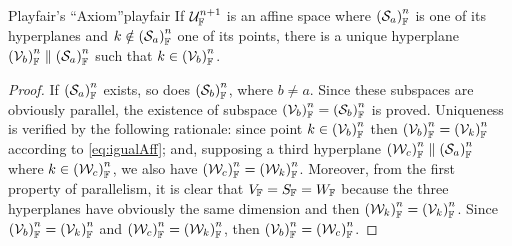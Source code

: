 \begin{mteo}{Playfair's ``Axiom''}{playfair}
If $\eamd{U}{F}{n+1}$ is an affine space where $\eamsd{S}{F}{a}{n}$ is one of its hyperplanes and $k\notin \eamsd{S}{F}{a}{n}$ one of its points, there is a unique hyperplane $\eamsd{V}{F}{b}{n}\parallel\eamsd{S}{F}{a}{n}$ such that $k\in\eamsd{V}{F}{b}{n}$.
\end{mteo}
\vspace{1pt}
{\footnotesize
\begin{proof}
If $\eamsd{S}{F}{a}{n}$ exists, so does $\eamsd{S}{F}{b}{n}$, where $b\neq a$. Since these subspaces are obviously parallel, the existence of subspace $\eamsd{V}{F}{b}{n}=\eamsd{S}{F}{b}{n}$ is proved. Uniqueness is verified by the following rationale: since point $k\in\eamsd{V}{F}{b}{n}$ then $\eamsd{V}{F}{b}{n}=\eamsd{V}{F}{k}{n}$ according to \eqref{eq:igualAff}; and, supposing a third hyperplane $\eamsd{W}{F}{c}{n}\parallel \eamsd{S}{F}{a}{n}$ where $k\in\eamsd{W}{F}{c}{n}$, we also have $\eamsd{W}{F}{c}{n}=\eamsd{W}{F}{k}{n}$. Moreover, from the first property of parallelism, it is clear that $V_\cam{F}=S_\cam{F}=W_\cam{F}$ because the three hyperplanes have obviously the same dimension and then $\eamsd{W}{F}{k}{n}=\eamsd{V}{F}{k}{n}$. Since $\eamsd{V}{F}{b}{n}=\eamsd{V}{F}{k}{n}$ and $\eamsd{W}{F}{c}{n}=\eamsd{W}{F}{k}{n}$, then $\eamsd{V}{F}{b}{n}=\eamsd{W}{F}{c}{n}$. 
\end{proof}}


